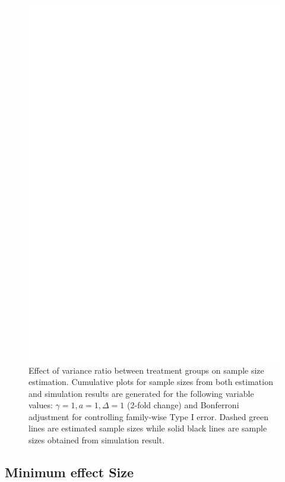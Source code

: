 \documentclass[12pt]{article}
\begin{document}
\begin{figure}%
  \caption[Effect of variance ratio between treatment groups on
    sample size estimation] {Effect of variance ratio between
    treatment groups on sample size estimation.  Cumulative plots for
    sample sizes from both estimation and simulation results are
    generated for the following variable values: $\gamma = 1, a = 1,
    \Delta = 1$ (2-fold change) and Bonferroni adjustment for
    controlling family-wise Type I error. Dashed green lines are
    estimated sample sizes while solid black lines are sample
    sizes obtained from simulation result.}  
  \label{fig:ResVar}
  \centerline{\includegraphics*[width=\textwidth]{ResVarF.pdf}}
\end{figure}

\subsection{Minimum effect Size}
\end{document}
